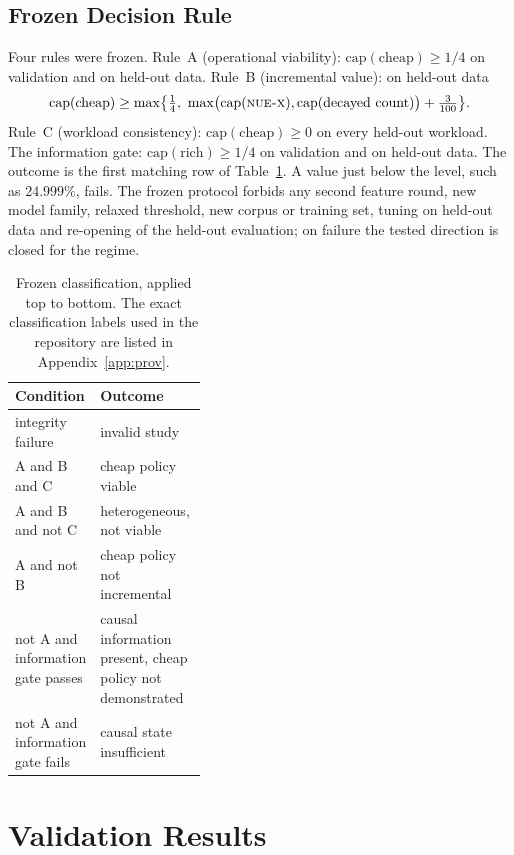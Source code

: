 \documentclass[11pt]{article}
\theoremstyle{plain}
\theoremstyle{definition}
\newcommand{\nuex}{\textsc{nue-x}}
\begin{document}
\subsection{Frozen Decision Rule}
\label{sec:rule}
Four rules were frozen. Rule~A (operational viability): $\mathrm{cap}(\text{cheap}) \ge 1/4$ on validation and on held-out data. Rule~B (incremental value): on held-out data
\[ \mathrm{cap}(\text{cheap}) \ge \max\bigl\{\tfrac14,\ \max\bigl(\mathrm{cap}(\nuex),\mathrm{cap}(\text{decayed count})\bigr)+\tfrac{3}{100}\bigr\}. \]
Rule~C (workload consistency): $\mathrm{cap}(\text{cheap}) \ge 0$ on every held-out workload. The information gate: $\mathrm{cap}(\text{rich}) \ge 1/4$ on validation and on held-out data. The outcome is the first matching row of Table~\ref{tab:classes}. A value just below the level, such as $24.999\%$, fails. The frozen protocol forbids any second feature round, new model family, relaxed threshold, new corpus or training set, tuning on held-out data and re-opening of the held-out evaluation; on failure the tested direction is closed for the regime.

\begin{table}[t]
\centering
\caption{Frozen classification, applied top to bottom. The exact classification labels used in the repository are listed in Appendix~\ref{app:prov}.}
\label{tab:classes}
\small
\begin{tabularx}{\linewidth}{>{\raggedright\arraybackslash}p{0.38\linewidth}>{\raggedright\arraybackslash}X}
\toprule
Condition & Outcome \\
\midrule
integrity failure & invalid study \\
A and B and C & cheap policy viable \\
A and B and not C & heterogeneous, not viable \\
A and not B & cheap policy not incremental \\
not A and information gate passes & causal information present, cheap policy not demonstrated \\
not A and information gate fails & causal state insufficient \\
\bottomrule
\end{tabularx}
\end{table}

\section{Validation Results}
\label{sec:valres}
\end{document}

